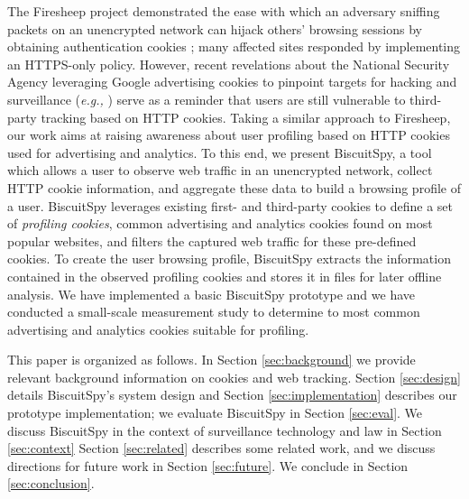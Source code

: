 The Firesheep project\cite{firesheep} demonstrated the ease with which an adversary sniffing packets on an unencrypted network can hijack others' browsing sessions by obtaining authentication cookies \cite{pcworld:firesheep}; many affected sites responded by implementing an HTTPS-only policy.
However, recent revelations about the National Security Agency leveraging Google advertising cookies to pinpoint targets for hacking and surveillance (\emph{e.g.,} \cite{wap:cookies, eff:nsa}) serve as a reminder that users are still vulnerable to third-party tracking based on HTTP cookies.
Taking a similar approach to Firesheep, our work aims at raising awareness about user profiling based on HTTP cookies used for advertising and analytics.
To this end, we present BiscuitSpy, a tool which allows a user to observe web traffic in an unencrypted network, collect HTTP cookie information, and aggregate these data to build a browsing profile of a user.
BiscuitSpy leverages existing first- and third-party cookies to define a set of \emph{profiling cookies}, common advertising and analytics cookies found on most popular websites, and filters the captured web traffic for these pre-defined cookies.
To create the user browsing profile, BiscuitSpy extracts the information contained in the observed profiling cookies and stores it in files for later offline analysis.
We have implemented a basic BiscuitSpy prototype and we have conducted a small-scale measurement study to determine to most common advertising and analytics cookies suitable for profiling.

This paper is organized as follows. In Section \ref{sec:background} we provide relevant background information on cookies and web tracking. Section \ref{sec:design} details BiscuitSpy's system design and Section \ref{sec:implementation} describes our prototype implementation; we evaluate BiscuitSpy in Section \ref{sec:eval}. We discuss BiscuitSpy in the context of surveillance technology and law in Section \ref{sec:context} Section \ref{sec:related} describes some related work, and we discuss directions for future work in Section \ref{sec:future}. We conclude in Section \ref{sec:conclusion}.